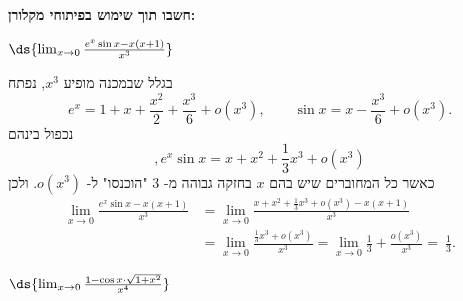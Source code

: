 \textbf{חשבו תוך שימוש בפיתוחי מקלורן:}
\bE{}
\item $\ds{\lim_{x \to 0} \frac{e^x \sin x - x(x+1)}{x^3}} $
\begin{solbox}
בגלל שבמכנה מופיע
$x^3$,
נפתח
\[
e^x=1+x+\frac{x^2}{2}+\frac{x^3}{6}+o(x^3),\qquad
\sin x=x-\frac{x^3}{6}+o(x^3).
\]
נכפול בינהם
\[
,e^x\sin x=x+x^2+\frac{1}{3}x^3+o(x^3)
\]
כאשר כל המחוברים שיש בהם
$x$
בחזקה גבוהה מ-
$3$
"הוכנסו" ל-
$o(x^3)$.
ולכן
\begin{align*}
\lim_{x\to0}\frac{e^x\sin x-x(x+1)}{x^3}&=\lim_{x\to0}\frac{x+x^2+\frac{1}{3}x^3+o(x^3)-x(x+1)}{x^3}\\
&=\lim_{x\to0}\frac{\frac{1}{3}x^3+o(x^3)}{x^3}
=\lim_{x\to0}\frac{1}{3}+\frac{o(x^3)}{x^3}=\ \frac13.
\end{align*}
\end{solbox}
\item $\ds{\lim_{x \to 0} \frac{1 - \cos x \cdot \sqrt{1 + x^2}}{x^4}}$

